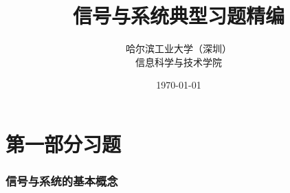 \documentclass[11pt,a4paper]{ctexart}
\title{\bfseries 信号与系统\quad 典型习题精编}
\author{哈尔滨工业大学（深圳）\\ 信息科学与技术学院}
\date{\today}
\begin{document}
\maketitle

\tableofcontents
\clearpage

\part*{第一部分\quad 习\quad 题}

\section{信号与系统的基本概念}
\end{document}
